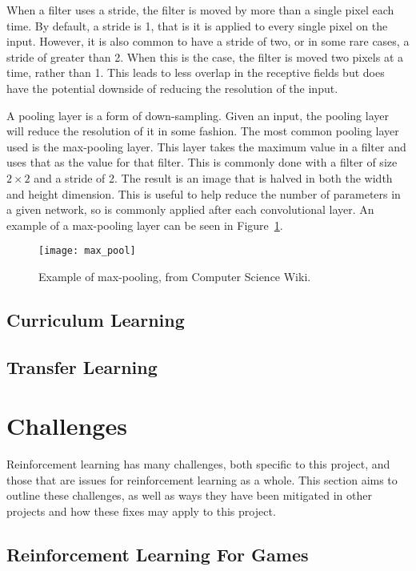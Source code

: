 When a filter uses a stride, the filter is moved by more than a single pixel
each time. By default, a stride is 1, that is it is applied to every single pixel
on the input. However, it is also common to have a stride of two, or in some
rare cases, a stride of greater than 2. When this is the case, the filter
is moved two pixels at a time, rather than 1. This leads to less overlap in the
receptive fields but does have the potential downside of reducing the
resolution of the input.

A pooling layer is a form of down-sampling. Given an input, the pooling layer
will reduce the resolution of it in some fashion. The most common pooling layer
used is the max-pooling layer. This layer takes the maximum value in a filter
and uses that as the value for that filter. This is commonly done with a filter
of size $2 \times 2$ and a stride of 2. The result is an image that is halved
in both the width and height dimension. This is useful to help reduce the number
of parameters in a given network, so is commonly applied after each
convolutional layer. An example of a max-pooling layer can be seen in
Figure~\ref{fig:max_pool}.

\begin{figure}
    \centering
    \texttt{[image: max\_pool]}
    \caption{Example of max-pooling, from Computer Science Wiki\cite{max_pool}.}%
    \label{fig:max_pool}
\end{figure}

\subsection{Curriculum Learning}

\subsection{Transfer Learning}

\section{Challenges}

Reinforcement learning has many challenges, both specific to this
project, and those that are issues for reinforcement learning as a whole.
This section aims to outline these challenges, as well as ways they have been
mitigated in other projects and how these fixes may apply to this project.

\subsection{Reinforcement Learning For Games}\label{challenges:games}

